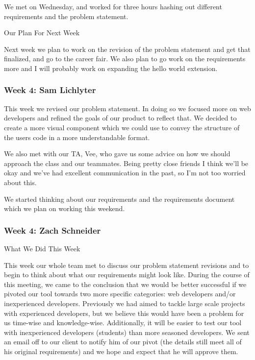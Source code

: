 We met on Wednesday, and worked for three hours hashing out different requirements and the problem statement. 



Our Plan For Next Week



Next week we plan to work on the revision of the problem statement and get that finalized, and go to the career fair. We also plan to go work on the requirements more and I will probably work on expanding the hello world extension. \\ 



 

 \subsubsection{Week 4: Sam Lichlyter}

This week we revised our problem statement. In doing so we focused more on web developers and refined the goals of our product to reflect that. We decided to create a more visual component which we could use to convey the structure of the users code in a more understandable format. 



We also met with our TA, Vee, who gave us some advice on how we should approach the class and our teammates. Being pretty close friends I think we'll be okay and we've had excellent communication in the past, so I'm not too worried about this. 



We started thinking about our requirements and the requirements document which we plan on working this weekend.  \\ 

 \subsubsection{Week 4: Zach Schneider}

What We Did This Week

This week our whole team met to discuss our problem statement revisions and to begin to think about what our requirements might look like. During the course of this meeting, we came to the conclusion that we would be better successful if we pivoted our tool towards two more specific categories: web developers and/or inexperienced developers. Previously we had aimed to tackle large scale projects with experienced developers, but we believe this would have been a problem for us time-wise and knowledge-wise. Additionally, it will be easier to test our tool with inexperienced developers (students) than more seasoned developers. We sent an email off to our client to notify him of our pivot (the details still meet all of his original requirements) and we hope and expect that he will approve them.



